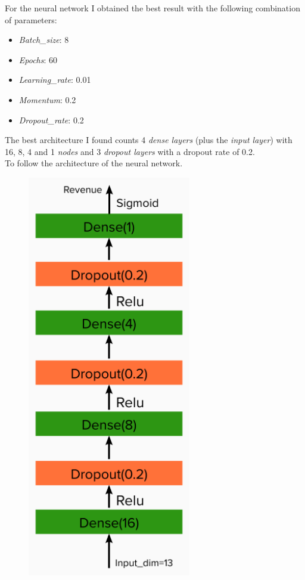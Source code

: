 \documentclass[a4paper,10pt]{report}
\begin{document}
For the neural network I obtained the best result with the following combination of parameters:
\begin{itemize}
    \item \emph{Batch\_size}: 8
    \item \emph{Epochs}: 60
    \item \emph{Learning\_rate}: 0.01
    \item \emph{Momentum}: 0.2
    \item \emph{Dropout\_rate}: 0.2
\end{itemize}
The best architecture I found counts 4 \emph{dense layers} (plus the \emph{input layer}) with 16, 8, 4 and 1 \emph{nodes} and 3 \emph{dropout layers} with a dropout rate of 0.2.\\
To follow the architecture of the neural network.
\begin{figure}[H]
    \centering
    \includegraphics[height = 500pt]{img/arch.png}
  \end{figure}
\end{document}
